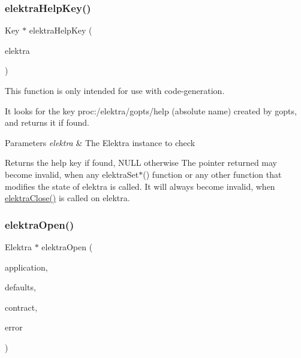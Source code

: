 \subsubsection{\texorpdfstring{elektra\+Help\+Key()}{elektraHelpKey()}}
{\footnotesize\ttfamily Key $\ast$ elektra\+Help\+Key (\begin{DoxyParamCaption}\item[{Elektra $\ast$}]{elektra }\end{DoxyParamCaption})}



This function is only intended for use with code-\/generation. 

It looks for the key proc\+:/elektra/gopts/help (absolute name) created by gopts, and returns it if found.


\begin{DoxyParams}{Parameters}
{\em elektra} & The Elektra instance to check\\
\hline
\end{DoxyParams}
\begin{DoxyReturn}{Returns}
the help key if found, N\+U\+LL otherwise The pointer returned may become invalid, when any {\ttfamily elektra\+Set$\ast$()} function or any other function that modifies the state of {\ttfamily elektra} is called. It will always become invalid, when \hyperlink{group__highlevel_ga9b688b7250e5f9d8ea6701cc2cc269af}{elektra\+Close()} is called on {\ttfamily elektra}. 
\end{DoxyReturn}
\mbox{\label{group__highlevel_ga45de58b05c7a8ab02f6c54ddd31a56e1}} 
\subsubsection{\texorpdfstring{elektra\+Open()}{elektraOpen()}}
{\footnotesize\ttfamily Elektra $\ast$ elektra\+Open (\begin{DoxyParamCaption}\item[{const char $\ast$}]{application,  }\item[{Key\+Set $\ast$}]{defaults,  }\item[{Key\+Set $\ast$}]{contract,  }\item[{Elektra\+Error $\ast$$\ast$}]{error }\end{DoxyParamCaption})}



